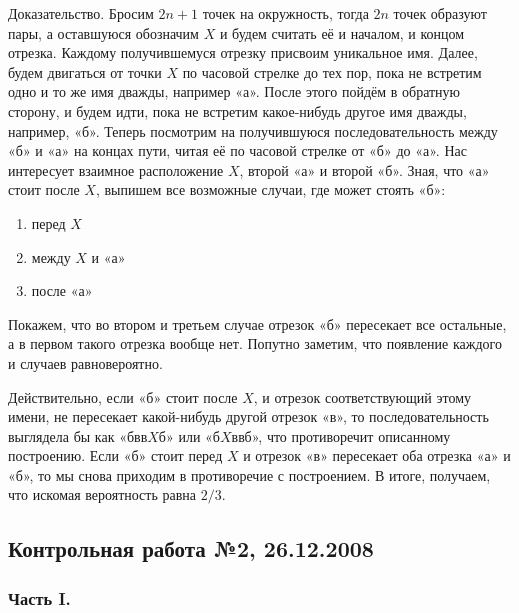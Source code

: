 \begin{enumerate}
Доказательство. Бросим $2n+1$ точек на окружность, тогда $2n$ точек образуют пары, а оставшуюся обозначим $X$ и будем считать её и началом, и концом отрезка.
Каждому получившемуся отрезку присвоим уникальное имя.
Далее, будем двигаться от точки $X$ по часовой стрелке до тех пор, пока не встретим одно и то же имя дважды, например «а».
После этого пойдём в обратную сторону, и будем идти, пока не встретим какое-нибудь другое имя дважды, например, «б».
Теперь посмотрим на получившуюся последовательность между «б» и «а» на концах пути, читая её по часовой стрелке от «б» до «а».
Нас интересует взаимное расположение $X$, второй «а» и второй «б».
Зная, что «а» стоит после $X$, выпишем все возможные случаи, где может стоять «б»:
\begin{enumerate}
\item перед $X$
\item между $X$ и «а»
\item после «а»
\end{enumerate}
Покажем, что во втором и третьем случае отрезок «б» пересекает все остальные, а в первом такого отрезка вообще нет. Попутно заметим, что появление каждого и случаев равновероятно.

Действительно, если «б» стоит после $X$, и отрезок соответствующий этому имени, не пересекает какой-нибудь другой отрезок «в», то последовательность выглядела бы как «бвв$X$б» или «б$X$ввб», что противоречит описанному построению.
Если «б» стоит перед $X$ и отрезок «в» пересекает оба отрезка «а» и «б», то мы снова приходим в противоречие с построением.
В итоге, получаем, что искомая вероятность равна $2/3$.
\end{enumerate}

\subsection{Контрольная работа №2, 26.12.2008}

\subsubsection*{Часть I.}

